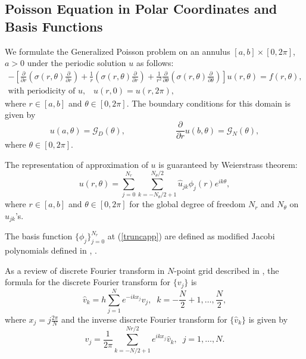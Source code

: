 
\subsection{Poisson Equation in Polar Coordinates and Basis Functions}

We formulate the Generalized Poisson problem on an annulus $[a, b]\times[0, 2\pi]$, $a > 0$ under the periodic solution $u$ as follows:
\begin{eqnarray}\label{genpois}
-\left[\frac{\partial}{\partial r} (\sigma(r,\theta) \frac{\partial}{\partial r}) + \frac{1}{r} (\sigma(r,\theta) \frac{\partial}{\partial r}) + \frac{1}{r^2}\frac{\partial}{\partial \theta} (\sigma(r,\theta)  \frac{\partial}{\partial \theta})\right] u(r, \theta) = f(r, \theta),\\
\mbox{with periodicity of }u, \;\;\; u(r,0) = u(r,2\pi),
\end{eqnarray}
where $r \in [a, b]$ and $\theta \in [0, 2 \pi]$. The boundary conditions for this domain is given by
\begin{equation}
u(a,\theta) = {\mathcal G}_D(\theta), \hspace{1in} \frac{\partial}{\partial r} u(b,\theta) = {\mathcal G}_N(\theta),
\end{equation}
where $\theta \in [0,2\pi]$.

\vspace{0.1in}
The representation of approximation of $u$ is guaranteed by Weierstrass theorem:
\begin{equation}\label{truncapp}
u(r,\theta) = \sum_{j=0}^{N_r} \sum_{k=-N_\theta/2+1}^{N_\theta/2} \hat{u}_{jk} \phi_j(r) e^{ik\theta},
\end{equation}
where $r \in [a, b]$ and $\theta \in [0, 2 \pi]$ for the global degree of freedom $N_r$ and $N_{\theta}$ on $\hat{u}_{jk}$'s.

\vspace{0.1in}
The basis function $\{\phi_j\}_{j=0}^{N_r}$ at (\ref{truncapp}) are defined as modified Jacobi polynomials defined in \cite{Karniadarkis}, \cite{Choe}.

\vspace{0.1in}
As a review of discrete Fourier transform in $N$-point grid described in \cite{Trefethen}, the formula for the discrete Fourier transform for $\{v_j\}$ is
\begin{equation}
\hat{v}_k = h \sum_{j=1}^{N} e^{-ikx_j}v_j, \;\; k = -\frac{N}{2}+1, \ldots , \frac{N}{2},
\end{equation}
where $x_j = j\frac{2\pi}{N}$ and the inverse discrete Fourier transform for $\{\hat{v}_k\}$ is given by
\begin{equation}
v_j = \frac{1}{2\pi}\sum_{k = -N/2+1}^{Nr/2}e^{ikx_j}\hat{v}_k,\;\; j = 1, \ldots, N.
\end{equation}


